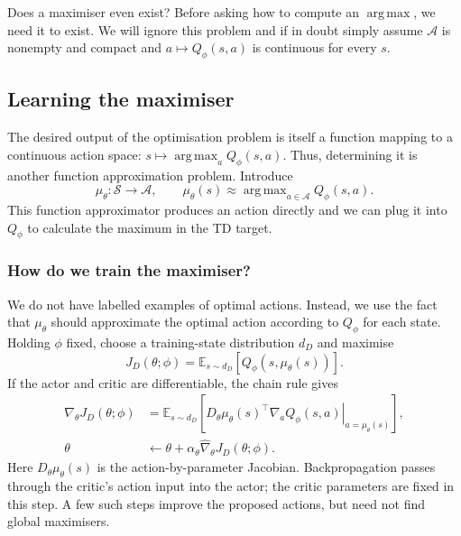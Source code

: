 \documentclass[11pt,a4paper]{article}
\newcommand{\E}{\mathbb{E}}
\DeclareMathOperator*{\argmax}{arg\,max}
\begin{document}
\begin{idea}{Does a maximiser even exist?}
Before asking how to compute an $\argmax$, we need it to exist. We will ignore this 
problem and if in doubt simply assume
$\mathcal A$ is nonempty and compact and $a\mapsto Q_\phi(s,a)$ is continuous
for every $s$.
\end{idea}

\subsection{Learning the maximiser}
The desired output of the optimisation problem is itself a function mapping to a continuous action space:
$s\mapsto\argmax_a Q_\phi(s,a)$. Thus, determining it is another
function approximation problem. Introduce
\begin{equation}
 \mu_\theta:\mathcal S\longrightarrow\mathcal A,
 \qquad
 \mu_\theta(s)\approx\argmax_{a\in\mathcal A}Q_\phi(s,a).
\end{equation}
This function approximator produces an action directly and we can plug it into $Q_\phi$ to calculate the maximum in the TD target.

\subsubsection{How do we train the maximiser?}
We do not have labelled examples of optimal actions. Instead, we use the fact that $\mu_\theta$ should approximate the optimal action according to $Q_\phi$ for each state. Holding $\phi$
fixed, choose a training-state distribution $d_D$ and maximise
\begin{equation}\label{eq:actor-objective}
 J_D(\theta;\phi)=\E_{s\sim d_D}\!\left[Q_\phi(s,\mu_\theta(s))\right].
\end{equation}
If the actor and critic are differentiable, the chain rule gives
\begin{equation}\label{eq:actor-gradient}
 \begin{aligned}
 \nabla_\theta J_D(\theta;\phi)
 &=\E_{s\sim d_D}\!\left[
   D_\theta\mu_\theta(s)^\top
   \left.\nabla_a Q_\phi(s,a)\right|_{a=\mu_\theta(s)}\right],\\
 \theta&\leftarrow\theta+\alpha_\theta\widehat\nabla_\theta J_D(\theta;\phi).
 \end{aligned}
\end{equation}
Here $D_\theta\mu_\theta(s)$ is the action-by-parameter Jacobian. Backpropagation
passes through the critic's action input into the actor; the critic parameters
are fixed in this step. A few such steps improve the proposed actions, but
need not find global maximisers.
\end{document}

